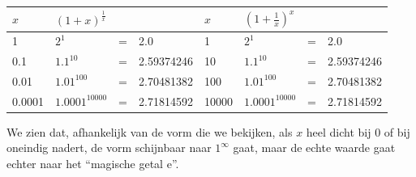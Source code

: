 \begin{table}[ht]
\centering
\begin{tabular}{|l|l|l|l||l|l|l|l|}
	\hline 
	$x$ & \multicolumn{3}{l||}{$\left(1+x\right)^{\frac{1}{x}}$}  & $x$ & \multicolumn{3}{l|}{$\left(1+\frac{1}{x}\right)^{x}$}\\
	\hline 
	\hline 
	1 & $2^{1}$ & = & 2.0  & 1 & $2^{1}$ & = & 2.0\\
	\hline 
	0.1 & $1.1^{10}$ & = & 2.59374246  & 10 & $1.1^{10}$ & = & 2.59374246\\
	\hline 
	0.01 & $1.01^{100}$ & = & 2.70481382  & 100 & $1.01^{100}$ & = & 2.70481382\\
	\hline 
	0.0001 & $1.0001^{10000}$ & = & 2.71814592  & 10000 & $1.0001^{10000}$ & = & 2.71814592\\
	\hline 
\end{tabular}
\end{table}



We zien dat, afhankelijk van de vorm die we bekijken, als
$x$ heel dicht bij $0$ of bij oneindig nadert, de vorm schijnbaar
naar $1^{\infty}$ gaat, maar de echte waarde gaat echter naar het
``magische getal e''.

